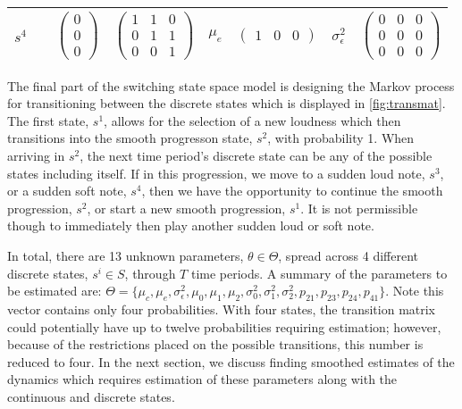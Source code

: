 \documentclass[12pt]{article}
\begin{document}
\begin{table}
\begin{tabular}[h!]{@{}ccccccccc@{}}
  \\
  \multicolumn{2}{c}{$s^4$} && $\begin{pmatrix} 0 \\ 0 \\ 0 \end{pmatrix}$ & $\begin{pmatrix} 1&1&0 \\ 0&1&1 \\ 0&0&1 \end{pmatrix}$ & $\mu_e$ & $\begin{pmatrix} 1&0&0 \end{pmatrix}$ & $\sigma_\epsilon^2$ & $\begin{pmatrix} 0&0&0 \\ 0&0&0 \\ 0&0&0 \end{pmatrix}$\\

\bottomrule
\end{tabular}
\end{table}

The final part of the switching state space model is designing the
Markov process for transitioning between the discrete states which is
displayed in \autoref{fig:transmat}. The first state, \(s^1\), allows
for the selection of a new loudness which then transitions into the
smooth progresson state, \(s^2\), with probability 1. When arriving in
\(s^2\), the next time period's discrete state can be any of the
possible states including itself. If in this progression, we move to a
sudden loud note, \(s^3\), or a sudden soft note, \(s^4\), then we have
the opportunity to continue the smooth progression, \(s^2\), or start a
new smooth progression, \(s^1\). It is not permissible though to
immediately then play another sudden loud or soft note.

In total, there are 13 unknown parameters, \(\theta \in \Theta\), spread
across 4 different discrete states, \(s^i \in S\), through \(T\) time
periods. A summary of the parameters to be estimated are:
\(\Theta = \{\mu_c, \mu_e, \sigma^2_\epsilon, \mu_0, \mu_1, \mu_2, \sigma^2_0, \sigma^2_1, \sigma^2_2, p_{21}, p_{23}, p_{24}, p_{41}\}\).
Note this vector contains only four probabilities. With four states, the
transition matrix could potentially have up to twelve probabilities
requiring estimation; however, because of the restrictions placed on the
possible transitions, this number is reduced to four. In the next
section, we discuss finding smoothed estimates of the dynamics which
requires estimation of these parameters along with the continuous and
discrete states.
\end{document}
